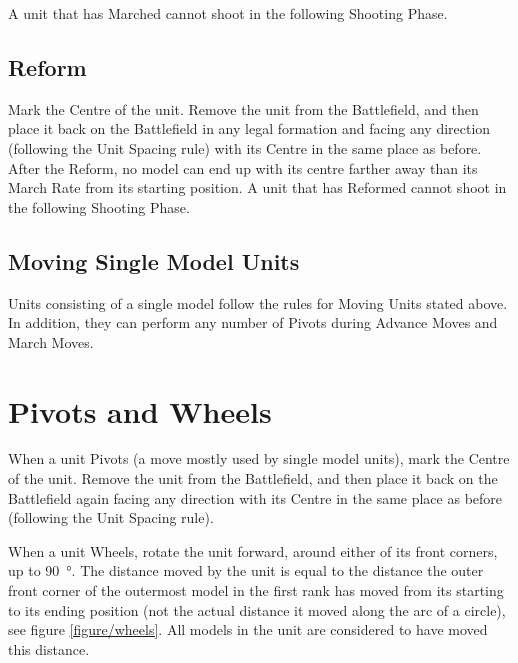 A unit that has Marched cannot shoot in the following Shooting Phase.

\subsection{Reform}
\label{reform}

Mark the Centre of the unit. Remove the unit from the Battlefield, and then place it back on the Battlefield in any legal formation and facing any direction (following the Unit Spacing rule) with its Centre in the same place as before. After the Reform, no model can end up with its centre farther away than its March Rate from its starting position. A unit that has Reformed cannot shoot in the following Shooting Phase.

\subsection{Moving Single Model Units}
\label{moving_single_model_units}

Units consisting of a single model follow the rules for Moving Units stated above. In addition, they can perform any number of Pivots during Advance Moves and March Moves.

\section{Pivots and Wheels}
\label{pivots_and_wheels}

When a unit Pivots (a move mostly used by single model units), mark the Centre of the unit. Remove the unit from the Battlefield, and then place it back on the Battlefield again facing any direction with its Centre in the same place as before (following the Unit Spacing rule).

When a unit Wheels, rotate the unit forward, around either of its front corners, up to \SI{90}{\degree}. The distance moved by the unit is equal to the distance the outer front corner of the outermost model in the first rank has moved from its starting to its ending position (not the actual distance it moved along the arc of a circle), see figure \ref{figure/wheels}. All models in the unit are considered to have moved this distance.

\newcommand{\wheelsA}{a)}
\newcommand{\wheelsB}{b)}
\newcommand{\wheelsC}{c)}

